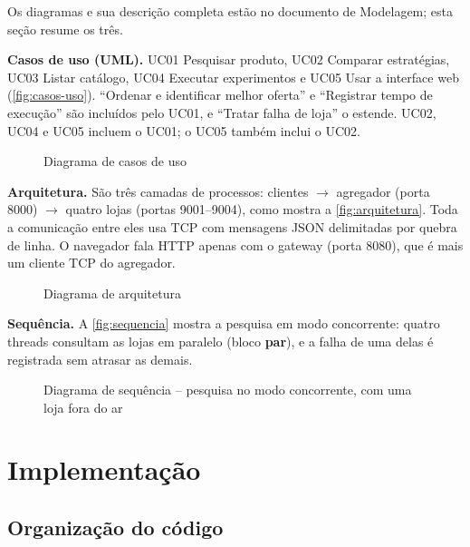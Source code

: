 Os diagramas e sua descrição completa estão no documento de Modelagem; esta seção resume os três.

\textbf{Casos de uso (UML).} UC01 Pesquisar produto, UC02 Comparar estratégias, UC03 Listar catálogo, UC04 Executar experimentos e UC05 Usar a interface web (\autoref{fig:casos-uso}). ``Ordenar e identificar melhor oferta'' e ``Registrar tempo de execução'' são incluídos pelo UC01, e ``Tratar falha de loja'' o estende. UC02, UC04 e UC05 incluem o UC01; o UC05 também inclui o UC02.

\begin{figure}[!htbp]
  \centering
  \caption{Diagrama de casos de uso}\label{fig:casos-uso}
  \fonteautores
\end{figure}

\textbf{Arquitetura.} São três camadas de processos: clientes $\rightarrow$ agregador (porta 8000) $\rightarrow$ quatro lojas (portas 9001--9004), como mostra a \autoref{fig:arquitetura}. Toda a comunicação entre eles usa TCP com mensagens JSON delimitadas por quebra de linha. O navegador fala HTTP apenas com o gateway (porta 8080), que é mais um cliente TCP do agregador.

\begin{figure}[!htbp]
  \centering
  \caption{Diagrama de arquitetura}\label{fig:arquitetura}
  \fonteautores
\end{figure}

\textbf{Sequência.} A \autoref{fig:sequencia} mostra a pesquisa em modo concorrente: quatro threads consultam as lojas em paralelo (bloco \textbf{par}), e a falha de uma delas é registrada sem atrasar as demais.

\begin{figure}[!htbp]
  \centering
  \caption{Diagrama de sequência -- pesquisa no modo concorrente, com uma loja fora do ar}\label{fig:sequencia}
  \fonteautores
\end{figure}

\chapter{Implementação}\label{cap:implementacao}

\section{Organização do código}

